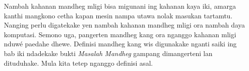 \documentclass[../../../include/open-logic-section]{subfiles}
\begin{document}
\begin{explain}
Nambah kahanan mandheg mligi bisa migunani
ing kahanan kaya iki, amarga kanthi mangkono
cetha kapan mesin nampa utawa nolak masukan
tartamtu. Nanging perlu digatekake yen
nambah kahanan mandheg mligi ora nambah
daya komputasi. Semono uga, pangerten
mandheg kang ora nganggo kahanan mligi nduwé paedahe
dhewe. Definisi mandheg kang wis digunakake
nganti saiki ing bab iki ndadekake bukti
\emph{Masalah Mandheg} gampang dimangerteni
lan dituduhake. Mula kita tetep nganggo
definisi asal.
\end{explain}
\end{document}
